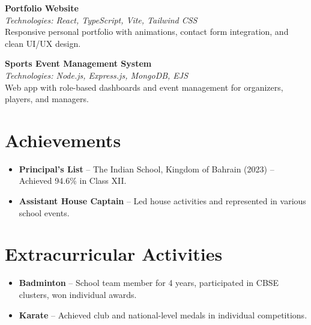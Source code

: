 \documentclass[11pt,a4paper]{article}
\begin{document}
\noindent %
\textbf{Portfolio Website} \\
\textit{Technologies: React, TypeScript, Vite, Tailwind CSS} \\
Responsive personal portfolio with animations, contact form integration, and clean UI/UX design.
\vspace{0.8em} %

\noindent %
\textbf{Sports Event Management System} \\
\textit{Technologies: Node.js, Express.js, MongoDB, EJS} \\
Web app with role-based dashboards and event management for organizers, players, and managers.

\section*{Achievements}
\begin{itemize}
    \item \textbf{Principal's List} – The Indian School, Kingdom of Bahrain (2023) – Achieved 94.6\% in Class XII.
    \item \textbf{Assistant House Captain} – Led house activities and represented in various school events.
\end{itemize}

\section*{Extracurricular Activities}
\begin{itemize}
    \item \textbf{Badminton} – School team member for 4 years, participated in CBSE clusters, won individual awards.
    \item \textbf{Karate} – Achieved club and national-level medals in individual competitions.
\end{itemize}
\end{document}

